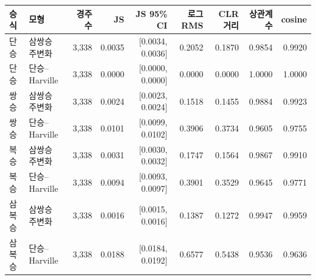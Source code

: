 \begin{tabular}{llrrrrrrr}
\toprule
승식 & 모형 & 경주 수 & JS & JS 95\% CI & 로그 RMS & CLR 거리 & 상관계수 & cosine \\
\midrule
단승 & 삼쌍승 주변화 & 3,338 & 0.0035 & [0.0034, 0.0036] & 0.2052 & 0.1870 & 0.9854 & 0.9920 \\
단승 & 단승--Harville & 3,338 & 0.0000 & [0.0000, 0.0000] & 0.0000 & 0.0000 & 1.0000 & 1.0000 \\
\addlinespace
쌍승 & 삼쌍승 주변화 & 3,338 & 0.0024 & [0.0023, 0.0024] & 0.1518 & 0.1455 & 0.9884 & 0.9923 \\
쌍승 & 단승--Harville & 3,338 & 0.0101 & [0.0099, 0.0102] & 0.3906 & 0.3734 & 0.9605 & 0.9755 \\
\addlinespace
복승 & 삼쌍승 주변화 & 3,338 & 0.0031 & [0.0030, 0.0032] & 0.1747 & 0.1564 & 0.9867 & 0.9910 \\
복승 & 단승--Harville & 3,338 & 0.0094 & [0.0093, 0.0097] & 0.3901 & 0.3529 & 0.9645 & 0.9771 \\
\addlinespace
삼복승 & 삼쌍승 주변화 & 3,338 & 0.0016 & [0.0015, 0.0016] & 0.1387 & 0.1272 & 0.9947 & 0.9959 \\
삼복승 & 단승--Harville & 3,338 & 0.0188 & [0.0184, 0.0192] & 0.6577 & 0.5438 & 0.9536 & 0.9636 \\
\bottomrule
\end{tabular}
